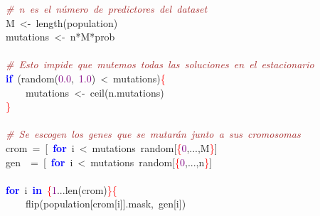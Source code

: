 \mbox{}\ \ \ \ \textit{\textcolor{Brown}{\#\ n\ es\ el\ número\ de\ predictores\ del\ dataset}} \\
\mbox{}\ \ \ \ M\ \textcolor{BrickRed}{\textless{}-}\ length\textcolor{BrickRed}{(}population\textcolor{BrickRed}{)} \\
\mbox{}\ \ \ \ mutations\ \textcolor{BrickRed}{\textless{}-}\ n\textcolor{BrickRed}{*}M\textcolor{BrickRed}{*}prob \\
\mbox{} \\
\mbox{}\ \ \ \ \textit{\textcolor{Brown}{\#\ Esto\ impide\ que\ mutemos\ todas\ las\ soluciones\ en\ el\ estacionario}} \\
\mbox{}\ \ \ \ \textbf{\textcolor{Blue}{if}}\ \textcolor{BrickRed}{(}random\textcolor{BrickRed}{(}\textcolor{Purple}{0.0}\textcolor{BrickRed}{,}\ \textcolor{Purple}{1.0}\textcolor{BrickRed}{)}\ \textcolor{BrickRed}{\textless{}}\ mutations\textcolor{BrickRed}{)}\textcolor{Red}{\{} \\
\mbox{}\ \ \ \ \ \ \ \ mutations\ \textcolor{BrickRed}{\textless{}-}\ ceil\textcolor{BrickRed}{(}n\textcolor{BrickRed}{.}mutations\textcolor{BrickRed}{)} \\
\mbox{}\ \ \ \ \textcolor{Red}{\}} \\
\mbox{} \\
\mbox{}\ \ \ \ \textit{\textcolor{Brown}{\#\ Se\ escogen\ los\ genes\ que\ se\ mutarán\ junto\ a\ sus\ cromosomas}} \\
\mbox{}\ \ \ \ crom\ \textcolor{BrickRed}{=}\ \textcolor{BrickRed}{[}\ \textbf{\textcolor{Blue}{for}}\ i\ \textcolor{BrickRed}{\textless{}}\ mutations\ random\textcolor{BrickRed}{[}\textcolor{Red}{\{}\textcolor{Purple}{0}\textcolor{BrickRed}{,...,}M\textcolor{Red}{\}}\textcolor{BrickRed}{]} \\
\mbox{}\ \ \ \ gen\ \ \textcolor{BrickRed}{=}\ \textcolor{BrickRed}{[}\ \textbf{\textcolor{Blue}{for}}\ i\ \textcolor{BrickRed}{\textless{}}\ mutations\ random\textcolor{BrickRed}{[}\textcolor{Red}{\{}\textcolor{Purple}{0}\textcolor{BrickRed}{,...,}n\textcolor{Red}{\}}\textcolor{BrickRed}{]} \\
\mbox{} \\
\mbox{}\ \ \ \ \textbf{\textcolor{Blue}{for}}\ i\ \textbf{\textcolor{Blue}{in}}\ \textcolor{Red}{\{}\textcolor{Purple}{1}\textcolor{BrickRed}{...}len\textcolor{BrickRed}{(}crom\textcolor{BrickRed}{)}\textcolor{Red}{\}\{} \\
\mbox{}\ \ \ \ \ \ \ \ flip\textcolor{BrickRed}{(}population\textcolor{BrickRed}{[}crom\textcolor{BrickRed}{[}i\textcolor{BrickRed}{]].}mask\textcolor{BrickRed}{,}\ gen\textcolor{BrickRed}{[}i\textcolor{BrickRed}{])} \\
